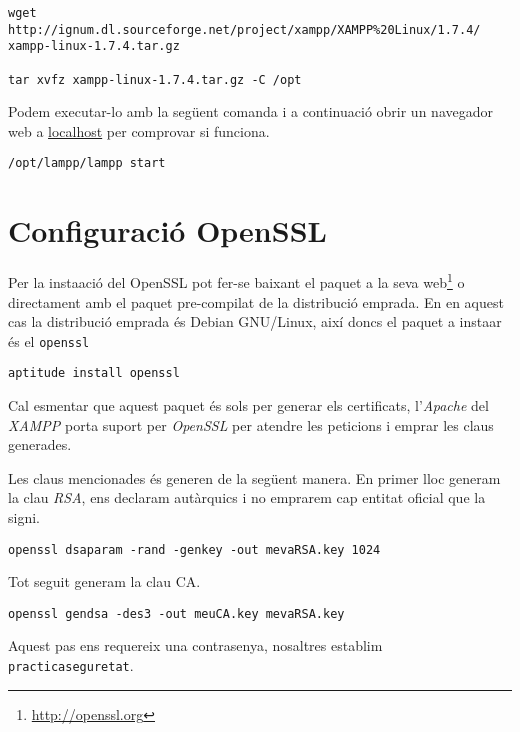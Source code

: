 \documentclass[a4paper,11pt]{scrartcl}
\begin{document}
\begin{verbatim}
wget http://ignum.dl.sourceforge.net/project/xampp/XAMPP%20Linux/1.7.4/
xampp-linux-1.7.4.tar.gz

tar xvfz xampp-linux-1.7.4.tar.gz -C /opt
\end{verbatim}

Podem executar-lo amb la següent comanda i a continuació obrir un navegador
web a \href{http://localhost}{localhost} per comprovar si funciona.

\begin{verbatim}
/opt/lampp/lampp start
\end{verbatim}

\section{Configuració OpenSSL}
Per la insta\lgem ació del OpenSSL pot fer-se baixant el paquet a la seva
web\footnote{\url{http://openssl.org}} o directament amb el paquet pre-compilat
de la distribució emprada. En en aquest cas la distribució emprada és Debian 
GNU/Linux, així doncs el paquet a insta\lgem ar és el \texttt{openssl}

\begin{verbatim}
aptitude install openssl
\end{verbatim}

Cal esmentar que aquest paquet és sols per generar els certificats, l'\emph{Apache} del
\emph{XAMPP} porta suport per \emph{OpenSSL} per atendre les peticions i emprar les claus generades.

Les claus mencionades és generen de la següent manera.
En primer lloc generam la clau \emph{RSA}, ens declaram autàrquics i no emprarem cap entitat
oficial que la signi.

\begin{verbatim}
openssl dsaparam -rand -genkey -out mevaRSA.key 1024
\end{verbatim}

Tot seguit generam la clau CA.

\begin{verbatim}
openssl gendsa -des3 -out meuCA.key mevaRSA.key
\end{verbatim}

Aquest pas ens requereix una contrasenya, nosaltres establim \texttt{practicaseguretat}.
\end{document}
